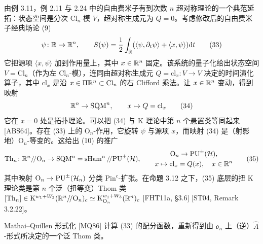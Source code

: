 \begin{example}[3.15（自由费米子的超对称形变）]
由例 3.11，例 2.11 与 2.24 中的自由费米子有到次数 $n$ 超对称理论的一个典范延拓：状态空间是分次 $\mathrm{Cl}_n$-模 $V$，超对称生成元为 $Q=0$。考虑修改后的自由费米子经典场论 (9)
\begin{equation}
\psi\colon\mathbb{R}\to\mathbb{R}^n,\qquad S(\psi)=\frac12\int_{\mathbb{R}}(\langle\psi,\partial_t\psi\rangle+\langle x,\psi\rangle)\mathrm{d} t
\tag{33}
\end{equation}
它把源项 $\langle x,\psi\rangle$ 加到作用量上，其中 $x\in\mathbb{R}^n$ 固定。该系统的量子化给出状态空间 $V=\mathrm{Cl}_n$（作为左 $\mathrm{Cl}_n$-模），连同由超对称生成元 $Q=\mathrm{cl}_x\colon V\to V$ 决定的时间演化算子，其中 $\mathrm{cl}_x$ 是沿 $x\in\Pi\mathbb{R}^n\subset\mathrm{Cl}_n$ 的右 Clifford 乘法。让 $x\in\mathbb{R}^n$ 变动，得到映射
\begin{equation}
\mathbb{R}^n\to\operatorname{SQM}^n,\qquad x\mapsto Q=\mathrm{cl}_x
\tag{34}
\end{equation}
它在 $x=0$ 处是拓扑理论。可以把 (34) 与 K 理论中第 $n$ 个悬置类等同起来 [ABS64]。存在 (33) 上的 $\mathrm{O}_n$-作用，它旋转 $\psi$ 与源项 $x$，而映射 (34) 是（射影地）$\mathrm{O}_n$-等变的。这给出 (10) 的推广
\begin{equation}
\operatorname{Th}_n\colon\mathbb{R}^n/\!/\mathrm{O}_n\to\operatorname{SQM}^n=\operatorname{sHam}^n/\!/\mathrm{PU}^\pm(\mathcal{H}),\qquad
\begin{gathered}\mathrm{O}_n\to\mathrm{PU}^\pm(\mathcal{H}),\\ x\mapsto\mathrm{cl}_x=Q(x),\quad x\in\mathbb{R}^n\end{gathered}
\tag{35}
\end{equation}
其中映射 $\mathrm{O}_n\to\mathrm{PU}^\pm(\mathcal{H}_n)$ 分类 $\mathrm{Pin}^c$-扩张。在命题 3.12 之下，(35) 底层的扭 K 理论类是第 $n$ 个泛（扭等变）Thom 类 $[\operatorname{Th}_n]\in\mathrm{K}^{w_1+W_3}(\mathbb{R}^n/\!/\mathrm{O}_n)_c\simeq\mathrm{K}^{w_1+W_3}_{\mathrm{O}_n}(\mathbb{R}^n)_c$ [FHT11a, §3.6] [ST04, Remark 3.2.22]。
\end{example}

\begin{remark}[3.16]
Mathai–Quillen 形式化 [MQ86] 计算 (33) 的配分函数，重新得到由 $\mathfrak{o}_n$ 上（逆）$\hat{A}$-形式所决定的一个泛 Thom 类。
\end{remark}

